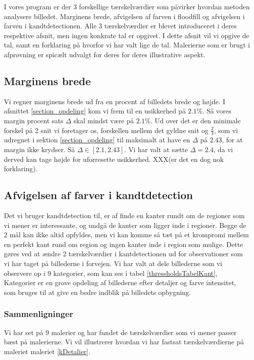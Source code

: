 {\sffamily
I vores program er der 3 forskellige tærskelværdier som påvirker hvordan
metoden analysere billedet. Marginens brede, afvigelsen af farven i
floodfill og afvigelsen i farven i kandtdetectionen. Alle 3
tærskelværdier er blevet introduceret i deres respektive afsnit, men
ingen konkrate tal er opgivet. I dette afsnit vil vi opgive de tal, samt
en forklaring på hvorfor vi har valt lige de tal. Malerierne som er
brugt i afprøvning er spicælt udvalgt for deres for deres illustrative
aspekt. 
}

\subsection{Marginens brede}
Vi regner marginens brede ud fra en procent af billedets brede og
højde. I afsnittet \ref{section_opdeling} kom vi frem til en
usikkerhed på $2.1 \%$. Så vores margin procent sats $\Delta$ skal mindst
være på $2.1 \%$. Ud over det er den minimale forskel på 2 snit vi foretager os,
forskellen mellem det gyldne snit og $\frac{2}{3}$, som vi udregnet i
sektion \ref{section_opdeling} til maksimalt at have en $\Delta$ på
$2.43$, for at margin ikke krydser. Så $\Delta \in [2.1, 2.43]$. Vi har valt
at sætte $\Delta = 2.4$, da vi derved kan tage højde for uforresette
usikkerhed. XXX(er det en dog nok forklaring).

\subsection{Afvigelsen af farver i kandtdetection}
Det vi bruger kandtdetection til, er af finde en kanter rundt om de
regioner som vi mener er interessante, og undgå de kanter som ligger
inde i regioner. Begge de 2 mål kan ikke altid opfyldes, men vi kan
komme så tæt på et krompromi mellem en perfekt kant rund om region og
ingen kanter inde i region som mulige. Dette gøres ved at ændre 2
tærskelværdier i kantdetectionen ud for observationer som vi har taget
på billederne i forvejen. Vi har valt at dele billederne som vi
observere op i 9 kategorier, som kan ses i tabel
\ref{thressholdsTabelKant}, Kategorier er en grove opdeling af
billederne efter detaljer og farve intensitet, som bruges til at give en
bedre indblik på billedets opbygning. 

\subsubsection{Sammenligninger}
Vi har set på 9 malerier og har fundet de tærskelværdier som vi mener
passer bæst på malerierne. Vi vil illustrerer hvordan vi har fastsat
tærskelværdierne på maleriet maleriet \ref{kDetalier}.

